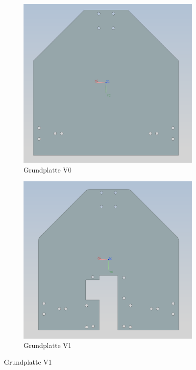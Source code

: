 \begin{figure}[H] %
    \centering
    \begin{subfigure}[b]{0.45\textwidth}
        \centering
        \includegraphics[width=\linewidth]{assets/MT/Grundplatte_V0.png}
        \caption{Grundplatte V0}
    \end{subfigure}
    \hfill
    \begin{subfigure}[b]{0.45\textwidth}
        \centering
        \includegraphics[width=\linewidth]{assets/MT/Grundplatte_V1.png}
        \caption{Grundplatte V1}
    \end{subfigure}


\end{figure}
